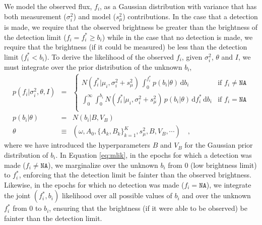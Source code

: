 \documentclass[12pt,preprint]{aastex}
\newcommand{\dd}{\mathrm{d}}
\newcommand{\fobs}{f_i}
\newcommand{\ftrue}{f_i^*}
\begin{document}
We model the observed flux, $\fobs$, as a Gaussian distribution with variance that has both measurement ($\sigma^2_i$) and model ($s^2_{\mu}$) contributions.  In the case that a detection is made, we require that the observed brightness be greater than the brightness of the detection limit ($\fobs = \ftrue \ge b_i$) while in the case that no detection is made, we require that the brightness (if it could be measured) be less than the detection limit ($\ftrue < b_i$).  To derive the likelihood of the observed $\fobs$, given $\sigma^2_i$, $\theta$ and $I$, we must integrate over the prior distribution of the unknown $b_i$,
\begin{eqnarray}\displaystyle
p(\fobs |\sigma^2_i,\theta,I) &=& \left\{\begin{array}{ll}
  N(\ftrue | \mu_i,  \sigma^2_i + s^2_{\mu})\,  \int_0^{\ftrue} p(b_i | \theta)\, \dd b_i & \mbox{if $\fobs \ne \texttt{NA}$} \\
  \int_{0}^{\infty} \int_{0}^{b_i} N(\ftrue | \mu_i, \sigma^2_i + s^2_{\mu})\, p(b_i | \theta)\, \dd \ftrue\, \dd b_i & \mbox{if $\fobs = \texttt{NA}$} \\
\end{array}\right.\label{eq:mlik}
\\
p(b_i|\theta) &=& N(b_i|B,V_B)
\label{eq:bprior}
\\
\theta &\equiv& (\omega, A_0, \{A_k, B_k\}_{k=1}^K, s^2_\mu, B, V_B, \cdots) \quad ,
\end{eqnarray}
where we have introduced the hyperparameters $B$ and $V_B$ for the Gaussian prior distribution of $b_i$.  In Equation \ref{eq:mlik}, in the epochs for which a detection was made ($\fobs \ne \texttt{NA}$), we marginalize over the unknown $b_i$ from $0$ (low brightness limit) to $\ftrue$, enforcing that the detection limit be fainter than the observed brightness.  Likewise, in the epochs for which no detection was made ($\fobs = \texttt{NA}$), we integrate the joint $(\ftrue, b_i)$ likelihood over all possible values of $b_i$ and over the unknown $\ftrue$ from $0$ to $b_i$, ensuring that the brightness (if it were able to be observed) be fainter than the detection limit.
\end{document}
